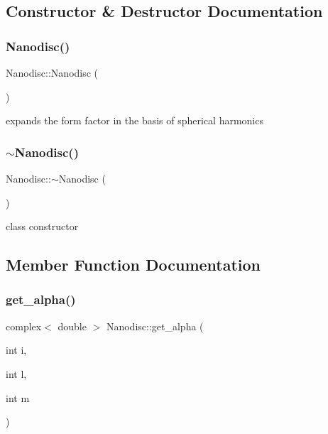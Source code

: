 \subsection{Constructor \& Destructor Documentation}
\mbox{\label{class_nanodisc_aa00e9eab42513fd080d8158eaae583bc}} 
\subsubsection{\texorpdfstring{Nanodisc()}{Nanodisc()}}
{\footnotesize\ttfamily Nanodisc\+::\+Nanodisc (\begin{DoxyParamCaption}{ }\end{DoxyParamCaption})}

expands the form factor in the basis of spherical harmonics \mbox{\label{class_nanodisc_a886aab21eceaf2faf04728ba3d965614}} 
\subsubsection{\texorpdfstring{$\sim$Nanodisc()}{~Nanodisc()}}
{\footnotesize\ttfamily Nanodisc\+::$\sim$\+Nanodisc (\begin{DoxyParamCaption}{ }\end{DoxyParamCaption})}

class constructor 

\subsection{Member Function Documentation}
\mbox{\label{class_nanodisc_a511f4de3610ae33b9c83e542b98c6441}} 
\subsubsection{\texorpdfstring{get\_alpha()}{get\_alpha()}}
{\footnotesize\ttfamily complex$<$ double $>$ Nanodisc\+::get\+\_\+alpha (\begin{DoxyParamCaption}\item[{int}]{i,  }\item[{int}]{l,  }\item[{int}]{m }\end{DoxyParamCaption})}

